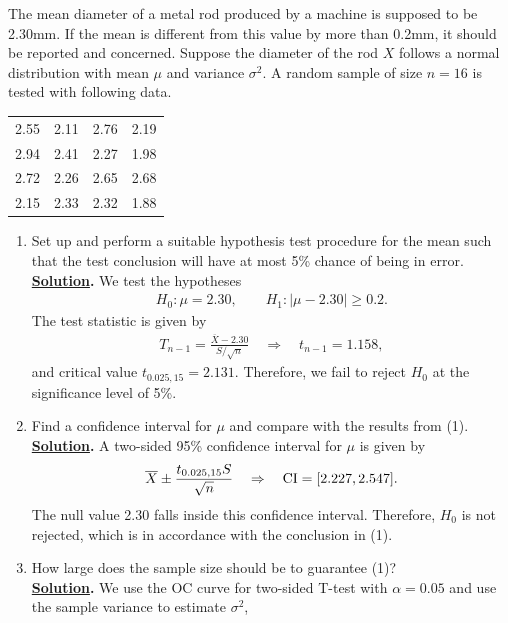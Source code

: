The mean diameter of a metal rod produced by a machine is supposed to be 2.30mm. If the mean is different from this value by more than 0.2mm, it should be reported and concerned. Suppose the diameter of the rod $X$ follows a normal distribution with mean $\mu$ and variance $\sigma^2$. A random sample of size $n = 16$ is tested with following data.
\begin{table}[H]
	\centering
	\begin{tabular}{cccc}
		2.55 & 2.11 & 2.76 & 2.19 \\
		2.94 & 2.41 & 2.27 & 1.98 \\
		2.72 & 2.26 & 2.65 & 2.68 \\
		2.15 & 2.33 & 2.32 & 1.88
	\end{tabular}
\end{table}
\begin{enumerate}
	\item Set up and perform a suitable hypothesis test procedure for the mean such that the test conclusion will have at most 5\% chance of being in error. \\
	\textbf{\underline{Solution}.} We test the hypotheses
	\begin{align*}
	H_0:\mu = 2.30, \qquad H_1: |\mu - 2.30| \geq 0.2.
	\end{align*}
	The test statistic is given by
	\begin{align*}
	T_{n-1} = \frac{\overline{X}-2.30}{S/\sqrt{n}}\quad\Rightarrow\quad t_{n-1} = 1.158,
	\end{align*}
	and critical value $t_{0.025, 15} = 2.131$. Therefore, we fail to reject $H_0$ at the significance level of 5\%.
	\item Find a confidence interval for $\mu$ and compare with the results from (1). \\
	\textbf{\underline{Solution}.} A two-sided 95\% confidence interval for $\mu$ is given by
	\begin{align*}
	\overline{X} \pm \frac{t_{0.025, 15} S}{\sqrt{n}}\quad\Rightarrow\quad \mathrm{CI} = [2.227, 2.547].
	\end{align*}
	The null value 2.30 falls inside this confidence interval. Therefore, $H_0$ is not rejected, which is in accordance with the conclusion in (1).
	\item How large does the sample size should be to guarantee (1)? \\
	\textbf{\underline{Solution}.} We use the OC curve for two-sided T-test with $\alpha = 0.05$ and use the sample variance to estimate $\sigma^2$,
	\begin{align*}

\end{align*}
\end{enumerate}
